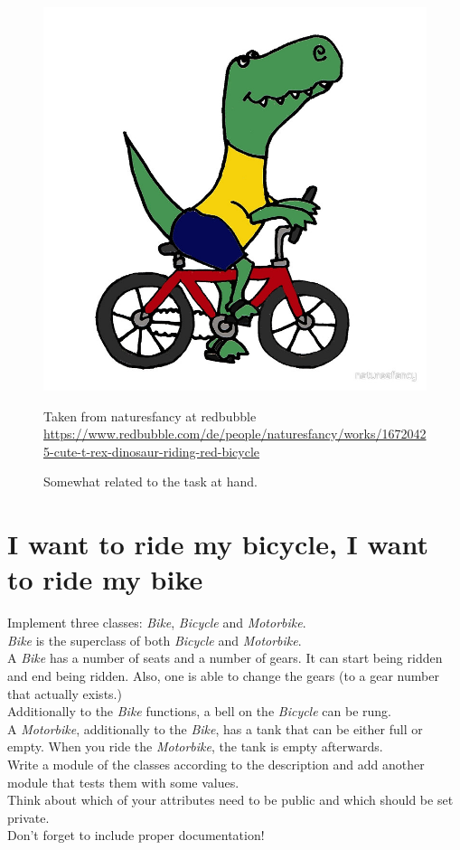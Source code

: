 \FloatBarrier
\begin{figure}[ht!]
	\centering
	\includegraphics[width=.8\textwidth]{dino_bike}
	\caption{Somewhat related to the task at hand.}
	Taken from naturesfancy at redbubble
	\url{https://www.redbubble.com/de/people/naturesfancy/works/16720425-cute-t-rex-dinosaur-riding-red-bicycle}
\end{figure}
\FloatBarrier

\section{I want to ride my bicycle, I want to ride my bike}
Implement three classes: \textit{Bike}, \textit{Bicycle} and \textit{Motorbike}.\\
\textit{Bike} is the superclass of both \textit{Bicycle} and \textit{Motorbike}.\\
A \textit{Bike} has a number of seats and a number of gears. It can start being ridden and
end being ridden. Also, one is able to change the gears (to a gear number that
actually exists.)\\
Additionally to the \textit{Bike} functions, a bell on the \textit{Bicycle} can be rung.\\
A \textit{Motorbike}, additionally to the \textit{Bike}, has a tank that can be
either full or empty. When you ride the \textit{Motorbike}, the tank is empty afterwards.\\
Write a module of the classes according to the description and add another module
that tests them with some values.\\
Think about which of your attributes need to be public and which should be set private.\\
Don't forget to include proper documentation!


